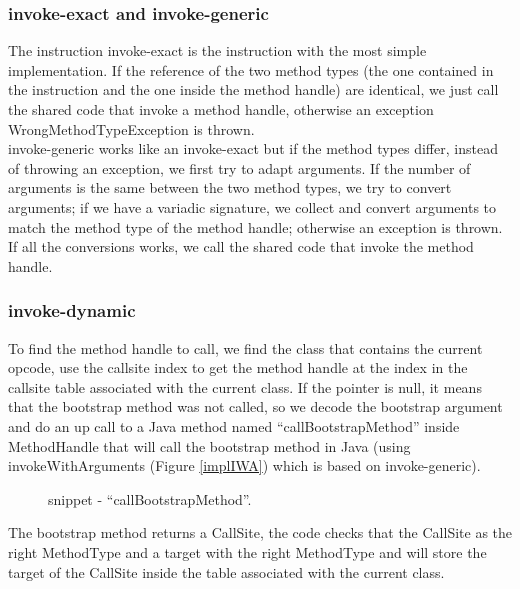 \documentclass{sig-alternate}
\begin{document}
    \subsubsection{invoke-exact and invoke-generic}
      The instruction invoke-exact is the instruction with the most simple implementation.
      If the reference of the two method types (the one contained in the instruction and the one inside the method handle)
      are identical, we just call the shared code that invoke a method handle,
      otherwise an exception WrongMethodTypeException is thrown.\\
      
      invoke-generic works like an invoke-exact but if the method types differ, instead of throwing an exception,
      we first try to adapt arguments.
      If the number of arguments is the same between the two method types, we try to convert arguments;
      if we have a variadic signature, we collect and convert arguments to match the method type of the method handle;
      otherwise an exception is thrown.
      If all the conversions works, we call the shared code that invoke the method handle.
  
    \subsubsection{invoke-dynamic}
      To find the method handle to call, we find the class that contains the current opcode,
      use the callsite index to get the method handle at the index
      in the callsite table associated with the current class.
      If the pointer is null, it means that the bootstrap method was not called,
      so we decode the bootstrap argument and do an up call to a Java method named ``callBootstrapMethod'' %
      inside MethodHandle that will call the bootstrap method in Java (using invokeWithArguments (Figure \ref{implIWA})
      which is based on invoke-generic).
      
      \begin{figure}[!h]
        \centering \vspace{-1.5em}
        \caption{snippet - ``callBootstrapMethod''.}\vspace{-1em}
        \label{implBSM}
      \end{figure}

      The bootstrap method returns a CallSite, the code checks that the CallSite as the right MethodType
      and a target with the right MethodType and will store the target of the CallSite inside the table
      associated with the current class.
\end{document}
